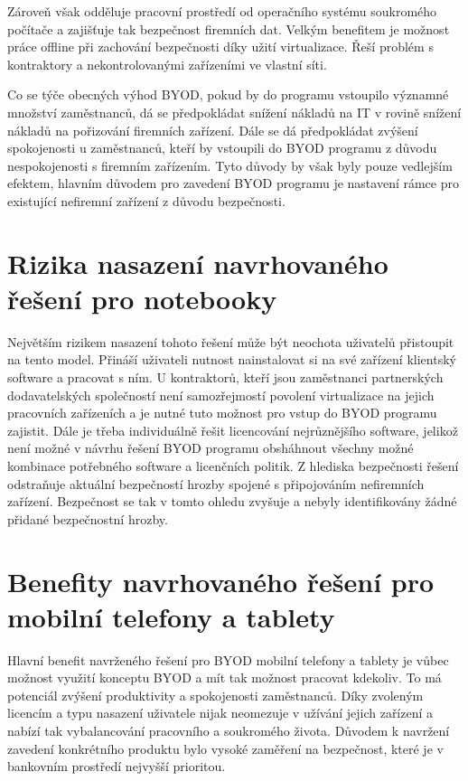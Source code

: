 Zároveň však odděluje pracovní prostředí od operačního systému soukromého počítače a zajišťuje tak bezpečnost firemních dat. Velkým benefitem je možnost práce offline při zachování bezpečnosti díky užití virtualizace. Řeší problém s kontraktory a nekontrolovanými zařízeními ve vlastní síti.

Co se týče obecných výhod BYOD, pokud by do programu vstoupilo významné množství zaměstnanců, dá se předpokládat snížení nákladů na IT v rovině snížení nákladů na pořizování firemních zařízení. Dále se dá předpokládat zvýšení spokojenosti u zaměstnanců, kteří by vstoupili do BYOD programu z důvodu nespokojenosti s firemním zařízením. Tyto důvody by však byly pouze vedlejším efektem, hlavním důvodem pro zavedení BYOD programu je nastavení rámce pro existující nefiremní zařízení z důvodu bezpečnosti.

\section{Rizika nasazení navrhovaného řešení pro notebooky}
Největším rizikem nasazení tohoto řešení může být neochota uživatelů přistoupit na tento model. Přináší uživateli nutnost nainstalovat si na své zařízení klientský software a pracovat s ním. U kontraktorů, kteří jsou zaměstnanci partnerských dodavatelských společností není samozřejmostí povolení virtualizace na jejich pracovních zařízeních a je nutné tuto možnost pro vstup do BYOD programu zajistit.  Dále je třeba individuálně řešit licencování nejrůznějšího software, jelikož není možné v návrhu řešení BYOD programu obsháhnout všechny možné kombinace potřebného software a licenčních politik. Z hlediska bezpečnosti řešení odstraňuje aktuální bezpečností hrozby spojené s připojováním nefiremních zařízení. Bezpečnost se tak v tomto ohledu zvyšuje a nebyly identifikovány žádné přidané bezpečnostní hrozby. 

\section{Benefity navrhovaného řešení pro mobilní telefony a tablety}
Hlavní benefit navrženého řešení pro BYOD mobilní telefony a tablety je vůbec možnost využití konceptu BYOD a mít tak možnost pracovat kdekoliv. To má potenciál zvýšení produktivity a spokojenosti zaměstnanců. Díky zvoleným licencím a typu nasazení uživatele nijak neomezuje v užívání jejich zařízení a nabízí tak vybalancování pracovního a soukromého života. Důvodem k navržení zavedení konkrétního produktu bylo vysoké zaměření na bezpečnost, které je v bankovním prostředí nejvyšší prioritou.

